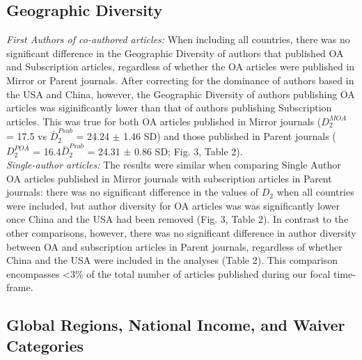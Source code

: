 \documentclass[
  english,
  man]{apa6}
\begin{document}
\hypertarget{geographic-diversity}{%
\subsection{Geographic Diversity}\label{geographic-diversity}}

\emph{First Authors of co-authored articles:} When including all countries, there was no significant difference in the Geographic Diversity of authors that published OA and Subscription articles, regardless of whether the OA articles were published in Mirror or Parent journals. After correcting for the dominance of authors based in the USA and China, however, the Geographic Diversity of authors publishing OA articles was siginificantly lower than that of authors publishing Subscription articles. This was true for both OA articles published in Mirror journals (\(D_2^{MOA}\) = 17.5 vs \(\bar{D}_2^{Psub}\) = 24.24 \(\pm\) 1.46 SD) and those published in Parent journals (\(D_2^{POA}\) = 16.4\(\bar{D}_2^{Psub}\) = 24.31 \(\pm\) 0.86 SD; Fig. 3, Table 2).\\
\emph{Single-author articles:} The results were similar when comparing Single Author OA articles published in Mirror journals with subscription articles in Parent journals: there was no significant difference in the values of \(D_{2}\) when all countries were included, but author diversity for OA articles was was significantly lower once China and the USA had been removed (Fig. 3, Table 2). In contrast to the other comparisons, however, there was no significant difference in author diversity between OA and subscription articles in Parent journals, regardless of whether China and the USA were included in the analyses (Table 2). This comparison encompasses \textless3\% of the total number of articles published during our focal time-frame.

\hypertarget{global-regions-national-income-and-waiver-categories}{%
\subsection{Global Regions, National Income, and Waiver Categories}\label{global-regions-national-income-and-waiver-categories}}
\end{document}
